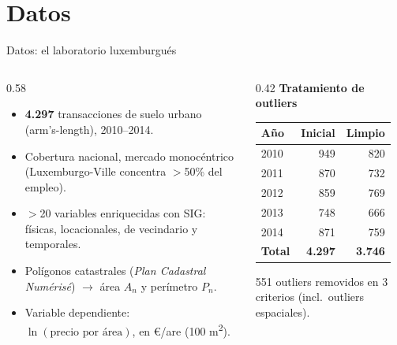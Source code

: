 \documentclass[11pt,aspectratio=169]{beamer}
\begin{document}
\section{Datos}
\begin{frame}{Datos: el laboratorio luxemburgués}
  \begin{columns}[T]
    \begin{column}{0.58\textwidth}
      \begin{itemize}
        \item \textbf{4.297} transacciones de suelo urbano (arm's-length), \alert{2010--2014}.
        \item Cobertura nacional, mercado \alert{monocéntrico} (Luxemburgo-Ville concentra $>$50\% del empleo).
        \item $>$20 variables enriquecidas con SIG: físicas, locacionales, de vecindario y temporales.
        \item Polígonos catastrales (\textit{Plan Cadastral Numérisé}) $\rightarrow$ área $A_n$ y perímetro $P_n$.
        \item Variable dependiente: $\ln(\text{precio por área})$, en €/are (100 m\textsuperscript{2}).
      \end{itemize}
    \end{column}
    \begin{column}{0.42\textwidth}
      \centering
      \textbf{Tratamiento de outliers}
      \vspace{0.3em}
      \begin{table}\scriptsize
      \begin{tabular}{lrr}
        \toprule
        Año & Inicial & Limpio \\
        \midrule
        2010 & 949 & 820 \\
        2011 & 870 & 732 \\
        2012 & 859 & 769 \\
        2013 & 748 & 666 \\
        2014 & 871 & 759 \\
        \midrule
        \textbf{Total} & \textbf{4.297} & \textbf{3.746} \\
        \bottomrule
      \end{tabular}
      \end{table}
      \scriptsize 551 outliers removidos en 3 criterios (incl.\ outliers espaciales).
    \end{column}
  \end{columns}
\end{frame}
\end{document}
